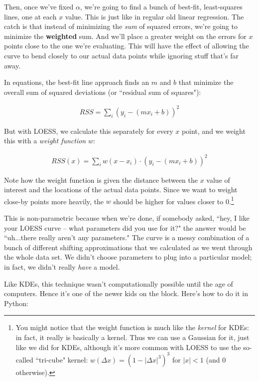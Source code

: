 \documentclass[12pt]{article}
\begin{document}
Then, once we've fixed $\alpha$, we're going to find a bunch of best-fit,
least-squares lines, one at each $x$ value. This is just like in regular old
linear regression. The catch is that instead of minimizing the \textit{sum} of
squared errors, we're going to minimize the \textbf{weighted} sum. And we'll
place a greater weight on the errors for $x$ points close to the one we're
evaluating. This will have the effect of allowing the curve to bend closely to
our actual data points while ignoring stuff that's far away.

In equations, the best-fit line approach finds an $m$ and $b$ that minimize
the overall sum of squared deviations (or ``residual sum of squares"):

\begin{align*}
RSS = \sum_i (y_i - (mx_i + b))^2
\end{align*}

But with LOESS, we calculate this separately for every $x$ point, and we
weight this with a \textit{weight function} $w$:

\begin{align*}
RSS(x) = \sum_i w(x-x_i) \cdot (y_i - (mx_i + b))^2
\end{align*}

Note how the weight function is given the distance between the $x$ value of
interest and the locations of the actual data points. Since we want to weight
close-by points more heavily, the $w$ should be higher for values closer to 
0.\footnote{You might notice that the weight function is much like the
\textit{kernel} for KDEs: in fact, it really is basically a kernel. Thus we
can use a Gaussian for it, just like we did for KDEs, although it's more
common with LOESS to use the so-called ``tri-cube" kernel: $w(\Delta x) = (1 -
|\Delta x|^3)^3$ for $|x|<1$ (and 0 otherwise).}

This is non-parametric because when we're done, if somebody asked, ``hey, I
like your LOESS curve -- what parameters did you use for it?" the answer would
be ``uh...there really aren't any parameters." The curve is a messy
combination of a bunch of different shifting approximations that we calculated
as we went through the whole data set. We didn't choose parameters to plug
into a particular model; in fact, we didn't really \textit{have} a model.

Like KDEs, this technique wasn't computationally possible until the age of
computers. Hence it's one of the newer kids on the block. Here's how to do it
in Python:
\end{document}
